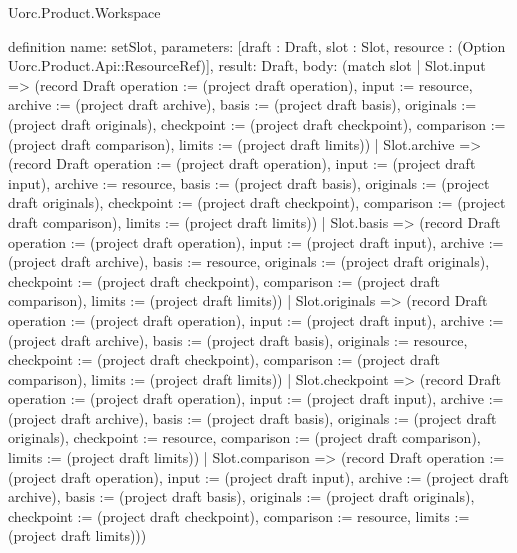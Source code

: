 \begin{lexlean}{Uorc.Product.Workspace}
\begin{semanticmodule}
definition{
  name: setSlot,
  parameters: [draft : Draft, slot : Slot, resource : (Option Uorc.Product.Api::ResourceRef)],
  result: Draft,
  body: (match slot
    | Slot.input => (record Draft {operation := (project draft operation), input := resource, archive := (project draft archive), basis := (project draft basis), originals := (project draft originals), checkpoint := (project draft checkpoint), comparison := (project draft comparison), limits := (project draft limits)})
    | Slot.archive => (record Draft {operation := (project draft operation), input := (project draft input), archive := resource, basis := (project draft basis), originals := (project draft originals), checkpoint := (project draft checkpoint), comparison := (project draft comparison), limits := (project draft limits)})
    | Slot.basis => (record Draft {operation := (project draft operation), input := (project draft input), archive := (project draft archive), basis := resource, originals := (project draft originals), checkpoint := (project draft checkpoint), comparison := (project draft comparison), limits := (project draft limits)})
    | Slot.originals => (record Draft {operation := (project draft operation), input := (project draft input), archive := (project draft archive), basis := (project draft basis), originals := resource, checkpoint := (project draft checkpoint), comparison := (project draft comparison), limits := (project draft limits)})
    | Slot.checkpoint => (record Draft {operation := (project draft operation), input := (project draft input), archive := (project draft archive), basis := (project draft basis), originals := (project draft originals), checkpoint := resource, comparison := (project draft comparison), limits := (project draft limits)})
    | Slot.comparison => (record Draft {operation := (project draft operation), input := (project draft input), archive := (project draft archive), basis := (project draft basis), originals := (project draft originals), checkpoint := (project draft checkpoint), comparison := resource, limits := (project draft limits)}))
}


\end{semanticmodule}
\end{lexlean}
